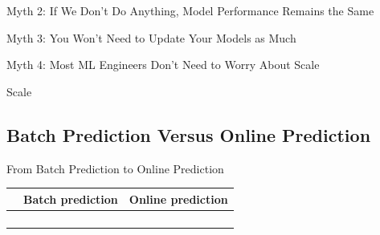 \begin{frame}{Myth 2: If We Don't Do Anything, Model Performance Remains the
    Same}
  \begin{tdblock}
  \end{tdblock}
  \begin{takeaway}
  \end{takeaway}
\end{frame}

\begin{frame}{Myth 3: You Won't Need to Update Your Models as Much}
  \begin{withmargin}
    \begin{tdmain}
    \end{tdmain}
    \begin{tdmargin}
    \end{tdmargin}
  \end{withmargin}
\end{frame}

\begin{frame}{Myth 4: Most ML Engineers Don't Need to Worry About Scale}
  \begin{tddef}{Scale}
  \end{tddef}
\end{frame}

\subsection{Batch Prediction Versus Online Prediction}

\begin{frame}{From Batch Prediction to Online Prediction}
  \footnotesize
  \renewcommand{\arraystretch}{1.35}
  \begin{tabular}{@{}%
    >{\raggedright\arraybackslash}p{}%
    >{\raggedright\arraybackslash}p{}%
    >{\raggedright\arraybackslash}p{}@{}}
    \toprule
     & \textbf{Batch prediction} & \textbf{Online prediction}\\
    \midrule
     & & \\
     & & \\
     & & \\
     & & \\
    \bottomrule
  \end{tabular}
\end{frame}

